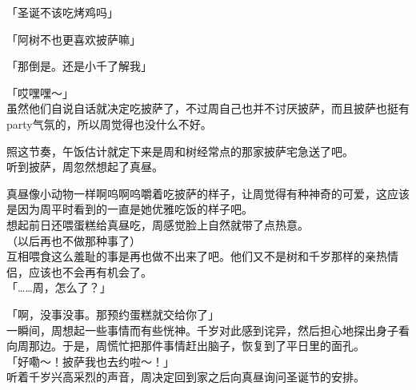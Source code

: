 「圣诞不该吃烤鸡吗」

「阿树不也更喜欢披萨嘛」

「那倒是。还是小千了解我」

「哎嘿嘿～」\\

虽然他们自说自话就决定吃披萨了，不过周自己也并不讨厌披萨，而且披萨也挺有party气氛的，所以周觉得也没什么不好。

照这节奏，午饭估计就定下来是周和树经常点的那家披萨宅急送了吧。\\

听到披萨，周忽然想起了真昼。

真昼像小动物一样啊呜啊呜嚼着吃披萨的样子，让周觉得有种神奇的可爱，这应该是因为周平时看到的一直是她优雅吃饭的样子吧。\\

想起前日还喂蛋糕给真昼吃，周感觉脸上自然就带了点热意。\\

（以后再也不做那种事了）\\

互相喂食这么羞耻的事是再也做不出来了吧。他们又不是树和千岁那样的亲热情侣，应该也不会再有机会了。\\

「……周，怎么了？」

「啊，没事没事。那预约蛋糕就交给你了」\\

一瞬间，周想起一些事情而有些恍神。千岁对此感到诧异，然后担心地探出身子看向周那边。于是，周慌忙把那件事情赶出脑子，恢复到了平日里的面孔。\\

「好嘞～！披萨我也去约啦～！」\\

听着千岁兴高采烈的声音，周决定回到家之后向真昼询问圣诞节的安排。
